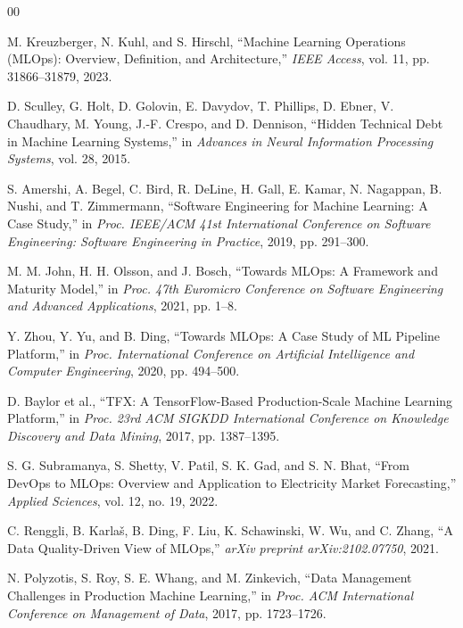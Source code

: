 \documentclass[runningheads]{llncs}
\begin{document}
\begin{thebibliography}{00}

M. Kreuzberger, N. Kuhl, and S. Hirschl, ``Machine Learning Operations (MLOps): Overview, Definition, and Architecture,'' \textit{IEEE Access}, vol. 11, pp. 31866--31879, 2023.

D. Sculley, G. Holt, D. Golovin, E. Davydov, T. Phillips, D. Ebner,
V. Chaudhary, M. Young, J.-F. Crespo, and D. Dennison,
``Hidden Technical Debt in Machine Learning Systems,''
in \textit{Advances in Neural Information Processing Systems}, vol. 28, 2015.

S. Amershi, A. Begel, C. Bird, R. DeLine, H. Gall, E. Kamar,
N. Nagappan, B. Nushi, and T. Zimmermann,
``Software Engineering for Machine Learning: A Case Study,''
in \textit{Proc. IEEE/ACM 41st International Conference on Software Engineering:
Software Engineering in Practice}, 2019, pp. 291--300.

M. M. John, H. H. Olsson, and J. Bosch, ``Towards MLOps: A Framework and Maturity Model,'' in \textit{Proc. 47th Euromicro Conference on Software Engineering and Advanced Applications}, 2021, pp. 1--8.

Y. Zhou, Y. Yu, and B. Ding, ``Towards MLOps: A Case Study of ML Pipeline Platform,'' in \textit{Proc. International Conference on Artificial Intelligence and Computer Engineering}, 2020, pp. 494--500.

D. Baylor et al.,
``TFX: A TensorFlow-Based Production-Scale Machine Learning Platform,''
in \textit{Proc. 23rd ACM SIGKDD International Conference on Knowledge Discovery and Data Mining},
2017, pp. 1387--1395.

S. G. Subramanya, S. Shetty, V. Patil, S. K. Gad, and S. N. Bhat, ``From DevOps to MLOps: Overview and Application to Electricity Market Forecasting,'' \textit{Applied Sciences}, vol. 12, no. 19, 2022.

C. Renggli, B. Karlaš, B. Ding, F. Liu, K. Schawinski, W. Wu, and C. Zhang, ``A Data Quality-Driven View of MLOps,'' \textit{arXiv preprint arXiv:2102.07750}, 2021.

N. Polyzotis, S. Roy, S. E. Whang, and M. Zinkevich,
``Data Management Challenges in Production Machine Learning,''
in \textit{Proc. ACM International Conference on Management of Data}, 2017,
pp. 1723--1726.


\end{thebibliography}
\end{document}
